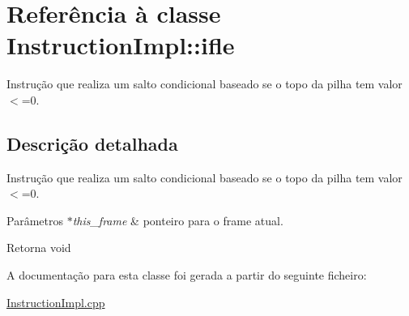 \hypertarget{class_instruction_impl_1_1ifle}{}\section{Referência à classe Instruction\+Impl\+:\+:ifle}
\label{class_instruction_impl_1_1ifle}


Instrução que realiza um salto condicional baseado se o topo da pilha tem valor $<$=0.  




\subsection{Descrição detalhada}
Instrução que realiza um salto condicional baseado se o topo da pilha tem valor $<$=0. 


\begin{DoxyParams}{Parâmetros}
{\em $\ast$this\+\_\+frame} & ponteiro para o frame atual. \\
\hline
\end{DoxyParams}
\begin{DoxyReturn}{Retorna}
void 
\end{DoxyReturn}


A documentação para esta classe foi gerada a partir do seguinte ficheiro\+:\begin{DoxyCompactItemize}
\item 
\hyperlink{_instruction_impl_8cpp}{Instruction\+Impl.\+cpp}\end{DoxyCompactItemize}
